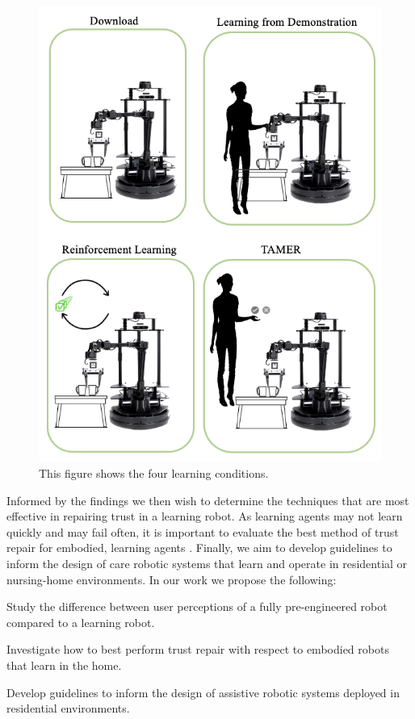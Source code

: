 \documentclass[letterpaper]{article} %
\begin{document}
\begin{figure}[t]
\centering
\includegraphics[scale=0.45]{Figures/four_agents.png}
\caption{This figure shows the four learning conditions.}
\label{fig:agent_types}
\end{figure}

Informed by the findings we then wish to determine the techniques that are most effective in repairing trust in a learning robot. As learning agents may not learn quickly and may fail often, it is important to evaluate the best method of trust repair for embodied, learning agents \cite{3374839}. Finally, we aim to develop guidelines to inform the design of care robotic systems that learn and operate in residential or nursing-home environments. In our work we propose the following:

\item Study the difference between user perceptions of a fully pre-engineered robot compared to a learning robot.
\item Investigate how to best perform trust repair with respect to embodied robots that learn in the home.
\item Develop guidelines to inform the design of assistive robotic systems deployed in residential environments.
\end{document}
